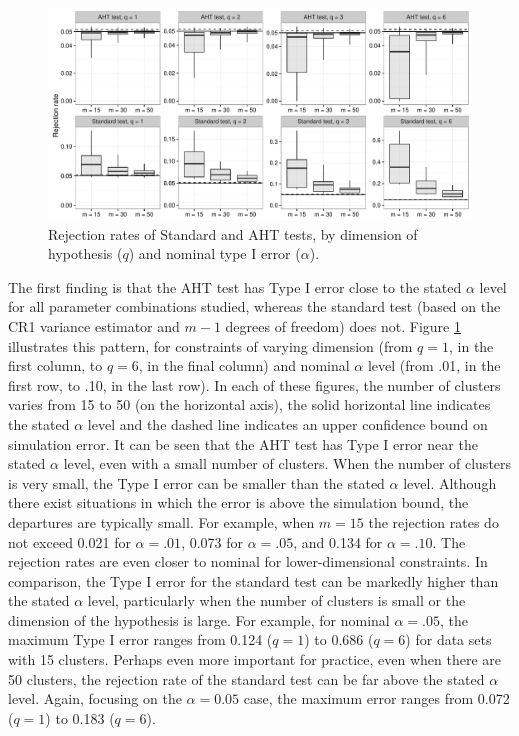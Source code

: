 \documentclass[draft]{ectaart}\usepackage[]{graphicx}\usepackage[]{color}
\newenvironment{knitrout}{}{} %
\begin{document}
\begin{knitrout}
\color{fgcolor}\begin{figure}

{\centering \includegraphics[width=\linewidth]{CR_fig/overview-1} 

}

\caption[Rejection rates of Standard and AHT tests, by dimension of hypothesis (]{Rejection rates of Standard and AHT tests, by dimension of hypothesis ($q$) and nominal type I error ($\alpha$).}\label{fig:overview}
\end{figure}


\end{knitrout}

The first finding is that the AHT test has Type I error close to the stated $\alpha$ level for all parameter combinations studied, whereas the standard test (based on the CR1 variance estimator and $m - 1$ degrees of freedom) does not. 
Figure \ref{fig:overview} illustrates this pattern, for constraints of varying dimension (from $q = 1$, in the first column, to $q = 6$, in the final column) and nominal $\alpha$ level (from .01, in the first row, to .10, in the last row). 
In each of these figures, the number of clusters varies from 15 to 50 (on the horizontal axis), the solid horizontal line indicates the stated $\alpha$ level and the dashed line indicates an upper confidence bound on simulation error.
It can be seen that the AHT test has Type I error near the stated $\alpha$ level, even with a small number of clusters.
When the number of clusters is very small, the Type I error can be smaller than the stated $\alpha$ level. 
Although there exist situations in which the error is above the simulation bound, the departures are typically small. For example, when $m = 15$ the rejection rates do not exceed 0.021 for $\alpha = .01$, 0.073 for $\alpha = .05$, and 0.134 for $\alpha = .10$.
The rejection rates are even closer to nominal for lower-dimensional constraints.
In comparison, the Type I error for the standard test can be markedly higher than the stated $\alpha$ level, particularly when the number of clusters is small or the dimension of the hypothesis is large. 
For example, for nominal $\alpha = .05$, the maximum Type I error ranges from 0.124 ($q = 1$) to 0.686 ($q = 6$) for data sets with 15 clusters.
Perhaps even more important for practice, even when there are 50 clusters, the rejection rate of the standard test can be far above the stated $\alpha$ level.
Again, focusing on the $\alpha = 0.05$ case, the maximum error ranges from 0.072 ($q = 1$) to 0.183 ($q = 6$).
\end{document}

